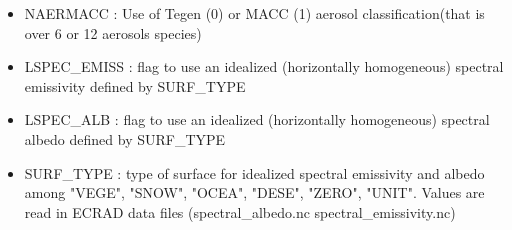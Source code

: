 \begin{itemize}
\item NAERMACC :  Use of Tegen (0) or MACC (1) aerosol classification(that is over 6 or 12 aerosols species)
 
 \item LSPEC\_EMISS : flag to use an idealized (horizontally homogeneous) spectral emissivity defined by SURF\_TYPE
 
  \item LSPEC\_ALB : flag to use an idealized (horizontally homogeneous) spectral albedo defined by SURF\_TYPE
 
   \item SURF\_TYPE : type of surface for idealized spectral emissivity and albedo among  "VEGE", "SNOW", "OCEA", "DESE", "ZERO", "UNIT". Values are read in ECRAD data files (spectral\_albedo.nc spectral\_emissivity.nc) 
\end{itemize}
\newpage

